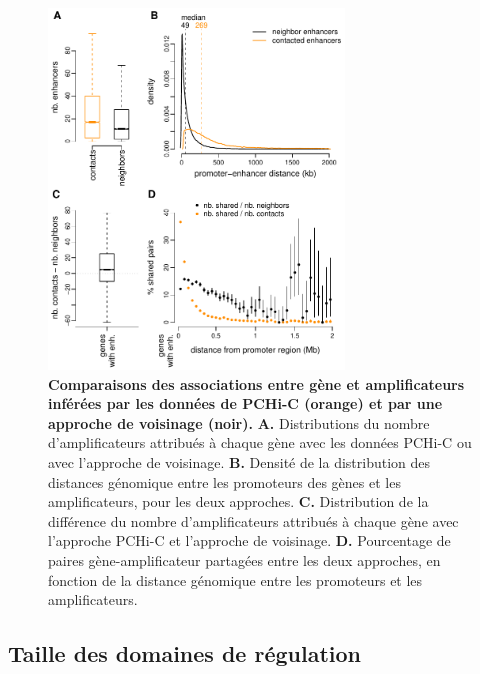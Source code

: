 \begin{figure}[H]
    \centering
    \includegraphics[width=0.7\textwidth, page=1]{figures/chap2/chap2-fig5.pdf}
    \caption[Comparaisons des associations entre gène et amplificateurs inférées par les données de \gls{PCHi-C} et par une approche de voisinage.]{
    \textbf{Comparaisons des associations entre gène et amplificateurs inférées par les données de \gls{PCHi-C} (orange) et par une approche de voisinage (noir).}
    \textbf{A.} Distributions du nombre d'amplificateurs attribués à chaque gène avec les données \gls{PCHi-C} ou avec l'approche de voisinage.
    \textbf{B.} Densité de la distribution des distances génomique entre les promoteurs des gènes et les amplificateurs, pour les deux approches. 
    \textbf{C.} Distribution de la différence du nombre d'amplificateurs attribués à chaque gène avec l'approche \gls{PCHi-C} et l'approche de voisinage. 
    \textbf{D.} Pourcentage de paires gène-amplificateur partagées entre les deux approches, en fonction de la distance génomique entre les promoteurs et les amplificateurs.
    }
    \label{fig:chap2-fig5}
\end{figure} 

\subsection{Taille des domaines de régulation}
\label{subsec:taille-domaine}


